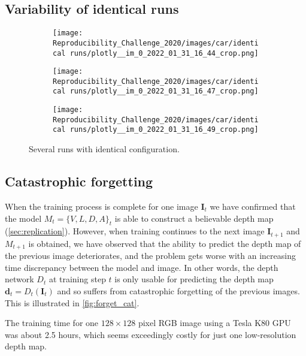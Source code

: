 \subsection{Variability of identical runs}


\begin{figure}[!htb]
\centering
\begin{subfigure}{0.32\textwidth}
    \centering
    \texttt{[image: Reproducibility\_Challenge\_2020/images/car/identical runs/plotly\_\_im\_0\_2022\_01\_31\_16\_44\_crop.png]}
    \caption{}
    \label{}
\end{subfigure}
\begin{subfigure}{0.32\textwidth}
    \centering
    \texttt{[image: Reproducibility\_Challenge\_2020/images/car/identical runs/plotly\_\_im\_0\_2022\_01\_31\_16\_47\_crop.png]}
    \caption{}
    \label{}
\end{subfigure}
\begin{subfigure}{0.32\textwidth}
    \centering
    \texttt{[image: Reproducibility\_Challenge\_2020/images/car/identical runs/plotly\_\_im\_0\_2022\_01\_31\_16\_49\_crop.png]}
    \caption{}
    \label{}
\end{subfigure}
    \caption{Several runs with identical configuration.}
    \label{fig:variability}
\end{figure}

\subsection{Catastrophic forgetting}
\label{sec:forget-appendix}
When the training process is complete for one image $\mathbf{I}_t$ we have confirmed that the model $M_t = \{V, L, D, A\}_t$ is able to construct a believable depth map (\autoref{sec:replication}). However, when training continues to the next image $\mathbf{I}_{t+1}$ and $M_{t+1}$ is obtained, we have observed that the ability  to predict the depth map of the previous image deteriorates, and the problem gets worse with an increasing time discrepancy between the model and image. %
In other words, the depth network $D_{t}$ at training step $t$ is only usable for predicting the depth map $\mathbf{d}_t = D_t(\mathbf{I}_t)$ and so suffers from catastrophic forgetting of the previous images. This is illustrated in \autoref{fig:forget_cat}.

The training time for one $128 \times 128$ pixel RGB image using a Tesla K80 GPU was about 2.5 hours, which seems exceedingly costly for just one low-resolution depth map.

